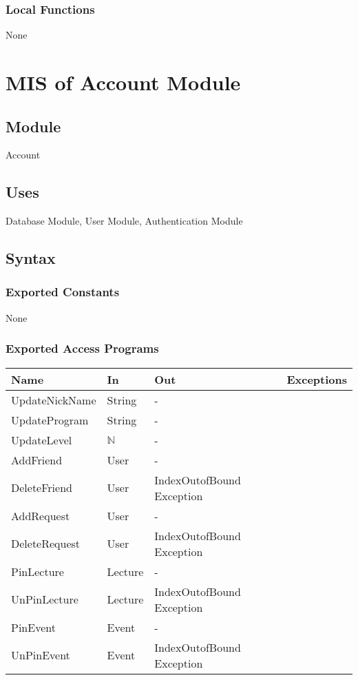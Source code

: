 \documentclass[12pt, titlepage]{article}
\begin{document}
\subsubsection{Local Functions}

None

\newpage

\section{MIS of Account Module} \label{mAccount}

\subsection{Module}

Account

\subsection{Uses}

Database Module, User Module, Authentication Module

\subsection{Syntax}

\subsubsection{Exported Constants}
None

\subsubsection{Exported Access Programs}
\begin{center}
\begin{tabular}{p{4cm} p{2cm} p{4cm} p{4cm}}
\hline
\textbf{Name} & \textbf{In} & \textbf{Out} & \textbf{Exceptions} \\
\hline
UpdateNickName & String & -\\
UpdateProgram & String & -\\
UpdateLevel & $\mathbb{N}$ & -\\
AddFriend & User & -\\
DeleteFriend & User & IndexOutofBound Exception\\
AddRequest & User & -\\
DeleteRequest & User & IndexOutofBound Exception\\
PinLecture & Lecture & - \\
UnPinLecture & Lecture & IndexOutofBound Exception\\
PinEvent & Event & - \\
UnPinEvent & Event & IndexOutofBound Exception\\
\hline
\end{tabular}
\end{center}
\end{document}
